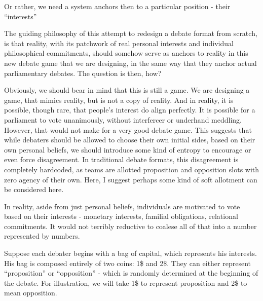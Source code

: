 Or rather, we need a system anchors then to a particular position - their ``interests''

The guiding philosophy of this attempt to redesign a debate format from scratch, is that reality, with its patchwork of real personal interests and individual philosophical commitments, should somehow serve as anchors to reality in this new debate game that we are designing, in the same way that they anchor actual parliamentary debates. The question is then, how?

Obviously, we should bear in mind that this is still a game. We are designing a game, that mimics reality, but is not a copy of reality. And in reality, it is possible, though rare, that people's interest do align perfectly. It is possible for a parliament to vote unanimously, without interfercer or underhand meddling. However, that would not make for a very good debate game. This suggests that while debaters should be allowed to choose their own initial sides, based on their own personal beliefs, we should introduce some kind of entropy to encourage or even force disagreement. In traditional debate formats, this disagreement is completely hardcoded, as teams are allotted proposition and opposition slots with zero agency of their own. Here, I suggest perhaps some kind of soft allotment can be considered here.

In reality, aside from just personal beliefs, individuals are motivated to vote based on their interests - monetary interests, familial obligations, relational commitments. It would not terribly reductive to coalese all of that into a number represented by numbers.

Suppose each debater begins with a bag of capital, which represents his interests. His bag is composed entirely of two coins: 1\$ and 2\$. They can either represent ``proposition'' or ``opposition'' - which is randomly determined at the beginning of the debate. For illustration, we will take 1\$ to represent proposition and 2\$ to mean opposition.

